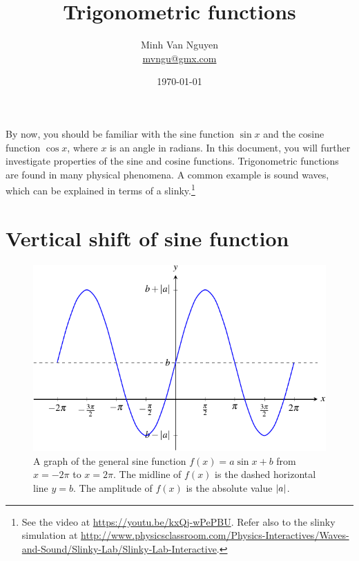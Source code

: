 \documentclass[a4paper,oneside,12pt]{article}
\begin{document}
\title{\Large\bf Trigonometric functions}
\author{%
  Minh Van Nguyen \\
  \url{mvngu@gmx.com}
}
\date{\today}
\maketitle

\noindent
By now, you should be familiar with the sine function $\sin x$ and the
cosine function $\cos x$, where $x$ is an angle in radians.  In this
document, you will further investigate properties of the sine and
cosine functions.  Trigonometric functions are found in many physical
phenomena.  A common example is sound waves, which can be explained in
terms of a slinky.\footnote{
  See the video at
  \url{https://youtu.be/kxQj-wPePBU}.  Refer also to the slinky
  simulation at
  \url{http://www.physicsclassroom.com/Physics-Interactives/Waves-and-Sound/Slinky-Lab/Slinky-Lab-Interactive}.
}



\section{Vertical shift of sine function}

\begin{figure}[!htbp]
\centering
\includegraphics[scale=1.1]{image/13/a-sin-b.pdf}
\caption{%
  A graph of the general sine function
  $f(x) = a \sin x + b$ from $x = -2\pi$ to $x = 2\pi$.  The midline
  of $f(x)$ is the dashed horizontal line $y = b$.  The amplitude of
  $f(x)$ is the absolute value $\lvert a\rvert$.
}
\label{fig:trigonometric:general_sine}
\end{figure}
\end{document}
